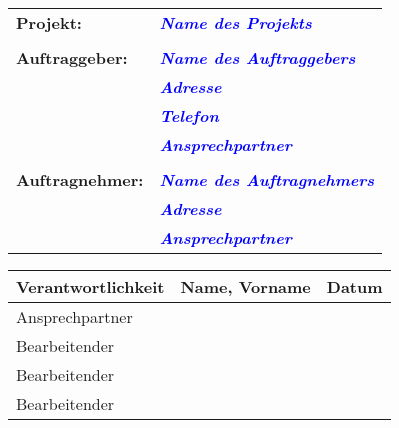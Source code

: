 \documentclass[includeheaders]{scrartcl}
\begin{document}
\maketitle
\begin{tabular}{l  l}
\textbf{Projekt:} & \textcolor{blue}{\itshape{\textbf{Name des Projekts}}}\\
&\\
\textbf{Auftraggeber: }& \textcolor{blue}{\itshape{\textbf{Name des Auftraggebers}}}\\
& \textcolor{blue}{\itshape{\textbf{Adresse}}} \\
& \textcolor{blue}{\itshape{\textbf{Telefon}}} \\
& \textcolor{blue}{\itshape{\textbf{Ansprechpartner}}} \\
&\\
\textbf{Auftragnehmer: }& \textcolor{blue}{\itshape{\textbf{Name des Auftragnehmers}}}\\
& \textcolor{blue}{\itshape{\textbf{Adresse}}} \\
& \textcolor{blue}{\itshape{\textbf{Ansprechpartner}}} \\
\end{tabular}

 
\newpage

\begin{table}[h]
	\center    
    \begin{tabular}{l | l | l}
    Verantwortlichkeit & Name, Vorname & Datum \\
    \hline
    Ansprechpartner    & ~             & ~     \\
    Bearbeitender      & ~             & ~     \\
    Bearbeitender      & ~             & ~     \\
    Bearbeitender      & ~             & ~     \\
    \end{tabular}
\end{table}

\newpage







\end{document}
